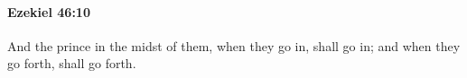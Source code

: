 
		\paragraph{Ezekiel 46:10} %
			\label{EZEKIEL-46-10}

			And the prince in the midst of them, when they go in, shall go in; and when they go forth, shall go forth.


